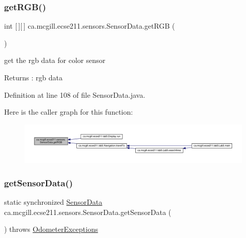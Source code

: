 \subsubsection{\texorpdfstring{get\+R\+G\+B()}{getRGB()}}
{\footnotesize\ttfamily int \mbox{[}$\,$\mbox{]}\mbox{[}$\,$\mbox{]} ca.\+mcgill.\+ecse211.\+sensors.\+Sensor\+Data.\+get\+R\+GB (\begin{DoxyParamCaption}{ }\end{DoxyParamCaption})}

get the rgb data for color sensor \begin{DoxyReturn}{Returns}
\+: rgb data 
\end{DoxyReturn}


Definition at line 108 of file Sensor\+Data.\+java.

Here is the caller graph for this function\+:
\nopagebreak
\begin{figure}[H]
\begin{center}
\leavevmode
\includegraphics[width=350pt]{classca_1_1mcgill_1_1ecse211_1_1sensors_1_1_sensor_data_a0abd08431dae67c7ee0e7a18b5305f91_icgraph}
\end{center}
\end{figure}
\mbox{\label{classca_1_1mcgill_1_1ecse211_1_1sensors_1_1_sensor_data_ab8aef4bdb5d9f3dad399656e00af2539}} 
\subsubsection{\texorpdfstring{get\+Sensor\+Data()}{getSensorData()}}
{\footnotesize\ttfamily static synchronized \hyperlink{classca_1_1mcgill_1_1ecse211_1_1sensors_1_1_sensor_data}{Sensor\+Data} ca.\+mcgill.\+ecse211.\+sensors.\+Sensor\+Data.\+get\+Sensor\+Data (\begin{DoxyParamCaption}{ }\end{DoxyParamCaption}) throws \hyperlink{classca_1_1mcgill_1_1ecse211_1_1odometer_1_1_odometer_exceptions}{Odometer\+Exceptions}\hspace{0.3cm}{\ttfamily [static]}}

